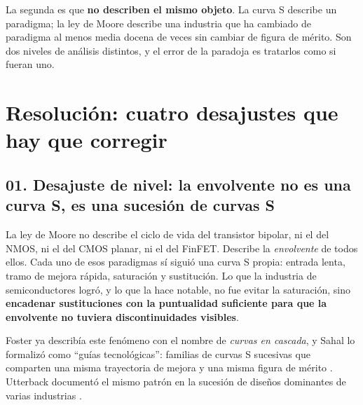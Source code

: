 \documentclass[11pt,letterpaper]{article}
\begin{document}
La segunda es que \textbf{no describen el mismo objeto}. La curva S describe un
paradigma; la ley de Moore describe una industria que ha cambiado de paradigma
al menos media docena de veces sin cambiar de figura de mérito. Son dos niveles
de análisis distintos, y el error de la paradoja es tratarlos como si fueran uno.

\section{Resolución: cuatro desajustes que hay que corregir}

\subsection*{01. Desajuste de nivel: la envolvente no es una curva S, es una
sucesión de curvas S}

La ley de Moore no describe el ciclo de vida del transistor bipolar, ni el del
NMOS, ni el del CMOS planar, ni el del FinFET. Describe la \emph{envolvente} de
todos ellos. Cada uno de esos paradigmas sí siguió una curva S propia: entrada
lenta, tramo de mejora rápida, saturación y sustitución. Lo que la industria de
semiconductores logró, y lo que la hace notable, no fue evitar la saturación,
sino \textbf{encadenar sustituciones con la puntualidad suficiente para que la
envolvente no tuviera discontinuidades visibles}.

Foster ya describía este fenómeno con el nombre de \emph{curvas en cascada}, y
Sahal lo formalizó como \enquote{guías tecnológicas}: familias de curvas S
sucesivas que comparten una misma trayectoria de mejora y una misma figura de
mérito \parencite{foster1986,sahal1985}. Utterback documentó el mismo patrón en
la sucesión de diseños dominantes de varias industrias \parencite{utterback1994}.
\end{document}
